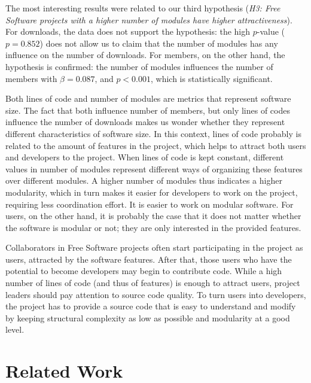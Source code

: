 \documentclass[conference]{IEEEtran}
\begin{document}
The most interesting results were related to our third hypothesis
(\emph{H3: Free Software projects with a higher number of modules have
higher attractiveness}).
For downloads, the data does not support the hypothesis: the high
$p$-value ( $p= 0.852$) does not allow us to claim that the number of
modules has any influence on the number of downloads. For members, on
the other hand, the hypothesis is confirmed: the number of modules
influences the number of members with $\beta = 0.087$, and $p<0.001$, which is
statistically significant.

Both lines of code and number of modules are metrics that represent software
size. The fact that both influence number of members, but only lines of codes
influence the number of downloads makes us wonder whether they represent
different characteristics of software size.
%
In this context, lines of code probably is related to the amount of features in the project, 
which helps to attract both users and developers to the project. 
When lines of code is kept constant, different values in number of modules represent
different ways of organizing these features over different modules. A
higher number of modules thus indicates a higher modularity, which in turn makes
it easier for developers to work on the project, requiring less
coordination effort. It is easier to work on modular software.
%
For users, on the other hand, it is probably the case that it does not matter
whether the software is modular or not; they are only interested in the provided features.

Collaborators in Free Software projects often start participating in the project as
users, attracted by the software features. After that, those users
who have the potential to become developers may begin to contribute code.
%
While a high number of lines of code (and thus of features) is enough to attract users, project leaders should pay attention to source
code quality. To turn users into developers, the project has to provide
a source code that is easy to understand and modify by keeping structural
complexity as low as possible and modularity at a good level.

\section{Related Work}
\label{relatedWork}
\end{document}
